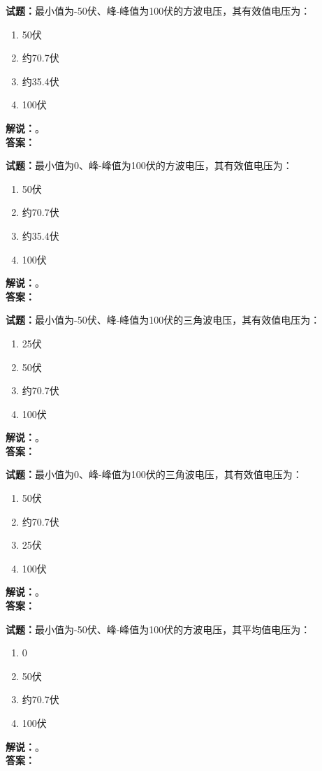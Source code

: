 \documentclass{ctexbook}
\begin{document}
\bigskip

\noindent\textbf{试题：}最小值为-50伏、峰-峰值为100伏的方波电压，其有效值电压为：
\begin{enumerate}[leftmargin=3em]
  \item 50伏
  \item 约70.7伏
  \item 约35.4伏
  \item 100伏
\end{enumerate}
\noindent\textbf{解说：}\textbf{}。\\\noindent\textbf{答案：}

\bigskip

\noindent\textbf{试题：}最小值为0、峰-峰值为100伏的方波电压，其有效值电压为：
\begin{enumerate}[leftmargin=3em]
  \item 50伏
  \item 约70.7伏
  \item 约35.4伏
  \item 100伏
\end{enumerate}
\noindent\textbf{解说：}\textbf{}。\\\noindent\textbf{答案：}

\bigskip

\noindent\textbf{试题：}最小值为-50伏、峰-峰值为100伏的三角波电压，其有效值电压为：
\begin{enumerate}[leftmargin=3em]
  \item 25伏
  \item 50伏
  \item 约70.7伏
  \item 100伏
\end{enumerate}
\noindent\textbf{解说：}\textbf{}。\\\noindent\textbf{答案：}

\bigskip

\noindent\textbf{试题：}最小值为0、峰-峰值为100伏的三角波电压，其有效值电压为：
\begin{enumerate}[leftmargin=3em]
  \item 50伏
  \item 约70.7伏
  \item 25伏
  \item 100伏
\end{enumerate}
\noindent\textbf{解说：}\textbf{}。\\\noindent\textbf{答案：}

\bigskip

\noindent\textbf{试题：}最小值为-50伏、峰-峰值为100伏的方波电压，其平均值电压为：
\begin{enumerate}[leftmargin=3em]
  \item 0
  \item 50伏
  \item 约70.7伏
  \item 100伏
\end{enumerate}
\noindent\textbf{解说：}\textbf{}。\\\noindent\textbf{答案：}
\end{document}
